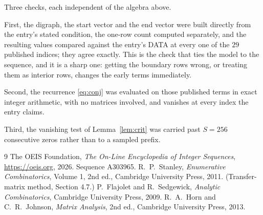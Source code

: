 \documentclass[11pt,a4paper]{article}
\theoremstyle{plain}
\theoremstyle{definition}
\begin{document}
Three checks, each independent of the algebra above.

First, the digraph, the start vector and the end vector were built directly from the
entry's stated condition, the one-row count computed separately, and the resulting values
compared against the entry's DATA at every one of the $29$ published indices; they
agree exactly. This is the check that ties the model to the sequence, and it is a sharp one:
getting the boundary rows wrong, or treating them as interior rows, changes the early terms
immediately.

Second, the recurrence \eqref{eq:conj} was evaluated on those published terms in exact
integer arithmetic, with no matrices involved, and vanishes at every index the entry claims.

Third, the vanishing test of Lemma~\ref{lem:crit} was carried past $S=256$ consecutive
zeros rather than to a sampled prefix.

\begin{thebibliography}{9}
 The OEIS Foundation, \emph{The On-Line Encyclopedia of Integer
Sequences}, \url{https://oeis.org}, 2026. Sequence A303965.
 R.~P.~Stanley, \emph{Enumerative Combinatorics}, Volume 1, 2nd ed.,
Cambridge University Press, 2011. (Transfer-matrix method, Section 4.7.)
 P.~Flajolet and R.~Sedgewick, \emph{Analytic Combinatorics}, Cambridge
University Press, 2009.
 R.~A.~Horn and C.~R.~Johnson, \emph{Matrix Analysis}, 2nd ed., Cambridge
University Press, 2013.
\end{thebibliography}
\end{document}
